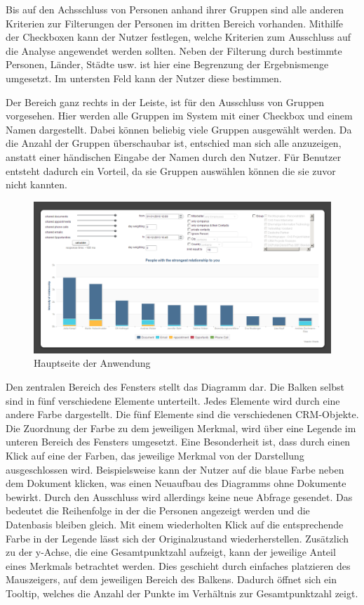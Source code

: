 Bis auf den Achsschluss von Personen anhand ihrer Gruppen sind alle anderen Kriterien zur Filterungen der Personen im dritten Bereich vorhanden. Mithilfe der Checkboxen kann der Nutzer festlegen, welche Kriterien zum Ausschluss auf die Analyse angewendet werden sollten. Neben der Filterung durch bestimmte Personen, Länder, Städte usw. ist hier eine Begrenzung der Ergebnismenge umgesetzt. Im untersten Feld kann der Nutzer diese bestimmen.

Der Bereich ganz rechts in der Leiste, ist für den Ausschluss von Gruppen vorgesehen. Hier werden alle Gruppen im System mit einer Checkbox und einem Namen dargestellt. Dabei können beliebig viele Gruppen ausgewählt werden. Da die Anzahl der Gruppen überschaubar ist, entschied man sich alle anzuzeigen, anstatt einer händischen Eingabe der Namen durch den Nutzer. Für Benutzer entsteht dadurch ein Vorteil, da sie Gruppen auswählen können die sie zuvor nicht kannten.

\begin{figure}[htbp]
\centering
\includegraphics[width=\textwidth]{pics/final_screen.png}
\caption{Hauptseite der Anwendung}
\label{ergebniss_oberflaeche_haupt}
\end{figure}

Den zentralen Bereich des Fensters stellt das Diagramm dar. Die Balken selbst sind in fünf verschiedene Elemente unterteilt. Jedes Elemente wird durch eine andere Farbe dargestellt. Die fünf Elemente sind die verschiedenen CRM-Objekte. Die Zuordnung der Farbe zu dem jeweiligen Merkmal, wird über eine Legende im unteren Bereich des Fensters umgesetzt. Eine Besonderheit ist, dass durch einen Klick auf eine der Farben, das jeweilige Merkmal von der Darstellung ausgeschlossen wird. Beispielsweise kann der Nutzer auf die blaue Farbe neben dem Dokument klicken, was einen Neuaufbau des Diagramms ohne Dokumente bewirkt. Durch den Ausschluss wird allerdings keine neue Abfrage gesendet. Das  bedeutet die Reihenfolge in der die Personen angezeigt werden und die Datenbasis bleiben gleich. Mit einem wiederholten Klick auf die entsprechende Farbe in der Legende lässt sich der Originalzustand wiederherstellen. Zusätzlich zu der y-Achse, die eine Gesamtpunktzahl aufzeigt, kann der jeweilige Anteil eines Merkmals betrachtet werden. Dies geschieht durch einfaches platzieren des Mauszeigers, auf dem jeweiligen Bereich des Balkens. Dadurch öffnet sich ein Tooltip, welches die Anzahl der Punkte im Verhältnis zur Gesamtpunktzahl zeigt.

